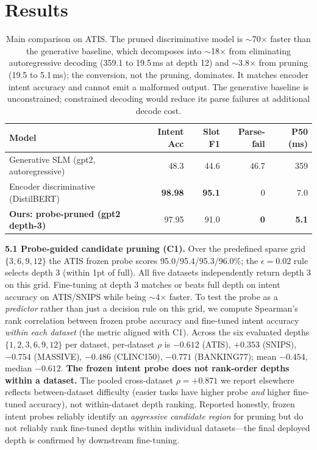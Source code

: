 \documentclass{article}
\begin{document}
\section{Results}\label{sec:results}

\begin{table}[t]\centering
\caption{Main comparison on ATIS. The pruned discriminative model is
$\sim$70$\times$ faster than the generative baseline, which decomposes into
$\sim$18$\times$ from eliminating autoregressive decoding (359.1 to 19.5\,ms at
depth 12) and $\sim$3.8$\times$ from pruning (19.5 to 5.1\,ms); the conversion,
not the pruning, dominates. It matches encoder intent accuracy and cannot emit a
malformed output. The generative baseline is unconstrained; constrained decoding
would reduce its parse failures at additional decode cost.}
\begin{tabular}{lrrrr}
\toprule
Model & Intent Acc & Slot F1 & Parse-fail & P50 (ms)\\
\midrule
Generative SLM (gpt2, autoregressive) & 48.3 & 44.6 & 46.7 & 359\\
Encoder discriminative (DistilBERT) & \textbf{98.98} & \textbf{95.1} & 0 & 7.0\\
\textbf{Ours: probe-pruned (gpt2 depth-3)} & 97.95 & 91.0 & \textbf{0} & \textbf{5.1}\\
\bottomrule
\end{tabular}
\end{table}

\textbf{5.1 Probe-guided candidate pruning (C1).} Over the predefined sparse
grid $\{3,6,9,12\}$ the ATIS frozen probe scores 95.0/95.4/95.3/96.0\%; the
$\epsilon{=}0.02$ rule selects depth 3 (within 1pt of full). All five datasets
independently return depth 3 on this grid. Fine-tuning at depth 3 matches or
beats full depth on intent accuracy on ATIS/SNIPS while being $\sim$4$\times$
faster. To test the probe as a \emph{predictor} rather than just a decision
rule on this grid, we compute Spearman's rank correlation between frozen probe
accuracy and fine-tuned intent accuracy \emph{within each dataset} (the metric
aligned with C1). Across the six evaluated depths $\{1,2,3,6,9,12\}$ per
dataset, per-dataset
$\rho$ is $-0.612$ (ATIS), $+0.353$ (SNIPS), $-0.754$ (MASSIVE), $-0.486$
(CLINC150), $-0.771$ (BANKING77); mean $-0.454$, median $-0.612$. \textbf{The
frozen intent probe does not rank-order depths within a dataset.} The pooled
cross-dataset $\rho{=}+0.871$ we report elsewhere reflects between-dataset
difficulty (easier tasks have higher probe \emph{and} higher fine-tuned
accuracy), not within-dataset depth ranking. Reported honestly, frozen intent
probes reliably identify an \emph{aggressive candidate region} for pruning
but do not reliably rank fine-tuned depths within individual datasets---the
final deployed depth is confirmed by downstream fine-tuning.
\end{document}
